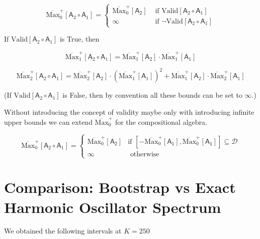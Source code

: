 \documentclass{article}
\theoremstyle{definition}
\begin{document}
\begin{equation}
    \overline{\text{Max}}^+_0[\mathsf{A}_2 \circ \mathsf{A}_1]
    =
        \begin{cases}
        \overline{\text{Max}}^+_0[\mathsf{A_2}] &\text{ if $\text{Valid}[\mathsf{A}_2 \circ \mathsf{A}_1]$} \\
        \infty &\text{ if $\lnot \text{Valid}[\mathsf{A}_2 \circ \mathsf{A}_1]$}
    \end{cases}
\end{equation}

If $\text{Valid}[\mathsf{A}_2 \circ \mathsf{A}_1]$ is True, then

\begin{equation}
    \overline{\text{Max}}^+_1[\mathsf{A}_2 \circ \mathsf{A}_1]
    =
    \overline{\text{Max}}^+_1[\mathsf{A}_2] 
    \cdot
    \overline{\text{Max}}^+_1[\mathsf{A}_1]
\end{equation}

\begin{equation}
    \overline{\text{Max}}^+_2[\mathsf{A}_2 \circ \mathsf{A}_1]
    =
    \overline{\text{Max}}^+_2[\mathsf{A}_2] 
    \cdot
    (\overline{\text{Max}}^+_1[\mathsf{A}_1])^2
    +
    \overline{\text{Max}}^+_1[\mathsf{A}_2] 
    \cdot
    \overline{\text{Max}}^+_2[\mathsf{A}_1]
\end{equation}

(If $\text{Valid}[\mathsf{A}_2 \circ \mathsf{A}_1]$ is False, then by convention all these bounds can be set to $\infty$.)


Without introducing the concept of validity maybe only with introducing infinite upper bounds we can extend $\overline{\text{Max}}^+_0$ for the compositional algebra.

\begin{equation}
    \overline{\text{Max}}^+_0[\mathsf{A}_2 \circ \mathsf{A}_1]
    =
        \begin{cases}
        \overline{\text{Max}}^+_0[\mathsf{A_2}] &\text{if } [-\overline{\text{Max}}^+_0[\mathsf{A_1}],\overline{\text{Max}}^+_0[\mathsf{A_1}]] \subseteq \mathcal{D} \\
        \infty &\text{ otherwise}
    \end{cases}
\end{equation}
\section{Comparison: Bootstrap vs Exact Harmonic Oscillator Spectrum}\label{sho_comparison}
We obtained the following intervals at $K = 250$ 


\newpage

%

%

\printbibliography

%

%

\end{document}
